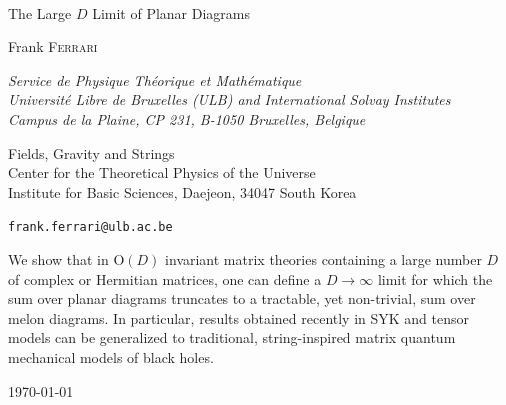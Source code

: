 \documentclass[12pt]{article}
\numberwithin{equation}{section}
\begin{document}
%
%
{\pagestyle{empty}
%
\parskip 0in
\

\vfill
%
\begin{center}
{\LARGE The Large $D$ Limit of Planar Diagrams}



\vspace{0.4in}

Frank F{\scshape errari}%
\\
\medskip
{\it Service de Physique Th\'eorique et Math\'ematique\\
Universit\'e Libre de Bruxelles (ULB) and International Solvay Institutes\\
Campus de la Plaine, CP 231, B-1050 Bruxelles, Belgique

\smallskip

Fields, Gravity and Strings\\
Center for the Theoretical Physics of the Universe\\
Institute for Basic Sciences, Daejeon, 34047 South Korea}


\smallskip
{\tt frank.ferrari@ulb.ac.be}
\end{center}
%
\vfill\noindent

We show that in $\text{O}(D)$ invariant matrix theories containing a large number $D$ of complex or Hermitian matrices, one can define a $D\rightarrow\infty$ limit for which the sum over planar diagrams truncates to a tractable, yet non-trivial, sum over melon diagrams. In particular, results obtained recently in SYK and tensor models can be generalized to traditional, string-inspired matrix quantum mechanical models of black holes.

\vfill

\medskip
%
\begin{flushleft}
\today
\end{flushleft}
%
\newpage\pagestyle{plain}
\baselineskip 16pt
\setcounter{footnote}{0}

}%
\end{document}

